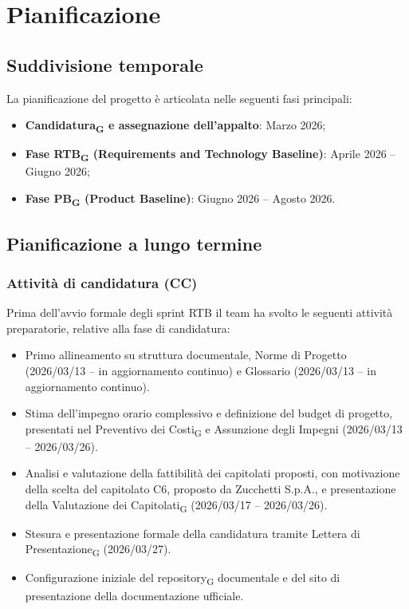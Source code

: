 \section{Pianificazione}

\subsection{Suddivisione temporale}

La pianificazione del progetto è articolata nelle seguenti fasi principali:
\begin{itemize}
\item \textbf{Candidatura\textsubscript{G} e assegnazione dell'appalto}: Marzo 2026;
\item \textbf{Fase RTB\textsubscript{G} (Requirements and Technology Baseline)}: Aprile 2026 -- Giugno 2026;
\item \textbf{Fase PB\textsubscript{G} (Product Baseline)}: Giugno 2026 -- Agosto 2026.
\end{itemize}

\subsection{Pianificazione a lungo termine}

\subsubsection{Attività di candidatura (CC)}

Prima dell'avvio formale degli sprint RTB il team ha svolto le seguenti attività
preparatorie, relative alla fase di candidatura:
\begin{itemize}
\item Primo allineamento su struttura documentale, Norme di Progetto
(2026/03/13 -- in aggiornamento continuo) e Glossario (2026/03/13 -- in aggiornamento continuo).
\item Stima dell'impegno orario complessivo e definizione del budget di progetto,
presentati nel Preventivo dei Costi\textsubscript{G} e Assunzione degli
Impegni (2026/03/13 -- 2026/03/26).
\item Analisi e valutazione della fattibilità dei capitolati proposti, con
motivazione della scelta del capitolato C6, proposto da Zucchetti S.p.A.,
e presentazione della Valutazione dei Capitolati\textsubscript{G}
(2026/03/17 -- 2026/03/26).
\item Stesura e presentazione formale della candidatura tramite Lettera di
Presentazione\textsubscript{G} (2026/03/27).
\item Configurazione iniziale del repository\textsubscript{G} documentale e del
sito di presentazione della documentazione ufficiale.
\end{itemize}

